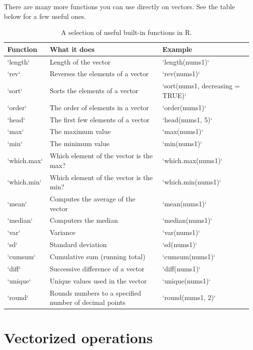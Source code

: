 \documentclass[]{book}
\begin{document}
There are many more functions you can use directly on vectors. See the table below for a few useful ones.

\begin{table}[t]

\caption{\label{tab:unnamed-chunk-13}A selection of useful built-in functions in R.}
\centering
\begin{tabular}{l|l|l}
\hline
Function & What it does & Example\\
\hline
`length` & Length of the vector & `length(nums1)`\\
\hline
`rev` & Reverses the elements of a vector & `rev(nums1)`\\
\hline
`sort` & Sorts the elements of a vector & `sort(nums1, decreasing = TRUE)`\\
\hline
`order` & The order of elements in a vector & `order(nums1)`\\
\hline
`head` & The first few elements of a vector & `head(nums1, 5)`\\
\hline
`max` & The maximum value & `max(nums1)`\\
\hline
`min` & The minimum value & `min(nums1)`\\
\hline
`which.max` & Which element of the vector is the max? & `which.max(nums1)`\\
\hline
`which.min` & Which element of the vector is the min? & `which.min(nums1)`\\
\hline
`mean` & Computes the average of the vector & `mean(nums1)`\\
\hline
`median` & Computers the median & `median(nums1)`\\
\hline
`var` & Variance & `var(nums1)`\\
\hline
`sd` & Standard deviation & `sd(nums1)`\\
\hline
`cumsum` & Cumulative sum (running total) & `cumsum(nums1)`\\
\hline
`diff` & Successive difference of a vector & `diff(nums1)`\\
\hline
`unique` & Unique values used in the vector & `unique(nums1)`\\
\hline
`round` & Rounds numbers to a specified number of decimal points & `round(nums1, 2)`\\
\hline
\end{tabular}
\end{table}

\hypertarget{vectorized-operations}{%
\section{Vectorized operations}\label{vectorized-operations}}
\end{document}
